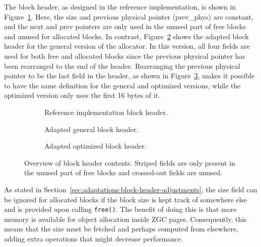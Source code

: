 The block header, as designed in the reference implementation, is shown in Figure~\ref{fig:blockheader_adap_reference}. Here, the size and previous physical pointer (prev\_phys) are constant, and the next and prev pointers are only used in the unused part of free blocks and unused for allocated blocks. In contrast, Figure~\ref{fig:blockheader_adap_general} shows the adapted block header for the general version of the allocator. In this version, all four fields are used for both free and allocated blocks since the previous physical pointer has been rearranged to the end of the header. Rearranging the previous physical pointer to be the last field in the header, as shown in Figure~\ref{fig:blockheader_adap_optimized}, makes it possible to have the same definition for the general and optimized versions, while the optimized version only uses the first 16 bytes of it.

\begin{figure}[h]
    \centering
    \begin{subfigure}[b]{0.3\textwidth}
        \centering
        
        \caption{Reference implementation block header.}
        \label{fig:blockheader_adap_reference}
    \end{subfigure}%
    \hfill
    \begin{subfigure}[b]{0.3\textwidth}
        \centering
        
        \caption{Adapted general block header.}
        \label{fig:blockheader_adap_general}
    \end{subfigure}%
    \hfill
    \begin{subfigure}[b]{0.3\textwidth}
        \centering
        
        \caption{Adapted optimized block header.}
        \label{fig:blockheader_adap_optimized}
    \end{subfigure}
    \caption{Overview of block header contents. Striped fields are only present in the unused part of free blocks and crossed-out fields are unused.}
    \label{fig:blockheader_adaptations}
\end{figure}

\newpage

As stated in Section~\ref{sec:adaptations:block-header-adjustments}, the size field can be ignored for allocated blocks if the block size is kept track of somewhere else and is provided upon calling \texttt{free()}. The benefit of doing this is that more memory is available for object allocation inside ZGC pages. Consequently, this means that the size must be fetched and perhaps computed from elsewhere, adding extra operations that might decrease performance. 

